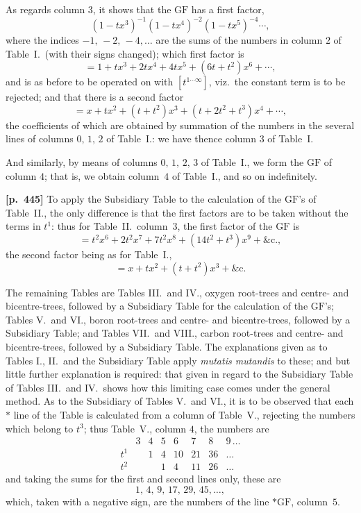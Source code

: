 \documentclass[11pt,a4paper]{article}
\providecommand{\GF}{\mathrm{GF}}
\begin{document}
\noindent As regards column $3$, it shows that the $\GF$ has a first factor,
\[
(1-tx^{3})^{-1}(1-tx^{4})^{-2}(1-tx^{5})^{-4}\cdots,
\]
where the indices $-1,\,-2,\,-4,\ldots$ are the sums of the numbers in column $2$ of Table~I.\ (with their signs changed); which first factor is
\[
= 1 + tx^{3} + 2tx^{4} + 4tx^{5} + (6t+t^{2})x^{6} + \cdots,
\]
and is as before to be operated on with $[t^{1\cdots\infty}]$, viz.\ the constant term is to be rejected; and that there is a second factor
\[
= x + tx^{2} + (t+t^{2})x^{3} + (t+2t^{2}+t^{3})x^{4} + \cdots,
\]
the coefficients of which are obtained by summation of the numbers in the several lines of columns $0,\,1,\,2$ of Table~I.: we have thence column $3$ of Table~I.

And similarly, by means of columns $0,\,1,\,2,\,3$ of Table~I., we form the $\GF$ of column $4$; that is, we obtain column~$4$ of Table~I., and so on indefinitely.

\bigskip
\noindent\textbf{[p.~445]}\quad
To apply the Subsidiary Table to the calculation of the $\GF$'s of Table~II., the only difference is that the first factors are to be taken without the terms in $t^{1}$: thus for Table~II.\ column~$3$, the first factor of the $\GF$ is
\[
= t^{2}x^{6} + 2t^{2}x^{7} + 7t^{2}x^{8} + (14t^{2}+t^{3})x^{9} + \&\mathrm{c.},
\]
the second factor being as for Table~I.,
\[
= x + tx^{2} + (t+t^{2})x^{3} + \&\mathrm{c.}
\]

The remaining Tables are Tables III.\ and IV., oxygen root-trees and centre- and bicentre-trees, followed by a Subsidiary Table for the calculation of the $\GF$'s; Tables V.\ and VI., boron root-trees and centre- and bicentre-trees, followed by a Subsidiary Table; and Tables VII.\ and VIII., carbon root-trees and centre- and bicentre-trees, followed by a Subsidiary Table.  The explanations given as to Tables I., II.\ and the Subsidiary Table apply \emph{mutatis mutandis} to these; and but little further explanation is required: that given in regard to the Subsidiary Table of Tables III.\ and IV.\ shows how this limiting case comes under the general method.  As to the Subsidiary of Tables V.\ and VI., it is to be observed that each $*$ line of the Table is calculated from a column of Table~V., rejecting the numbers which belong to $t^{3}$; thus Table~V., column $4$, the numbers are
\[
\begin{array}{l|ccccccc}
& 3 & 4 & 5 & 6 & 7 & 8 & 9\,\ldots\\\hline
t^{1} & & 1 & 4 & 10 & 21 & 36 & \ldots\\
t^{2} & & & 1 & 4 & 11 & 26 & \ldots
\end{array}
\]
and taking the sums for the first and second lines only, these are
\[
1,\,4,\,9,\,17,\,29,\,45,\ldots,
\]
which, taken with a negative sign, are the numbers of the line $*\GF$, column~$5$.
\end{document}
